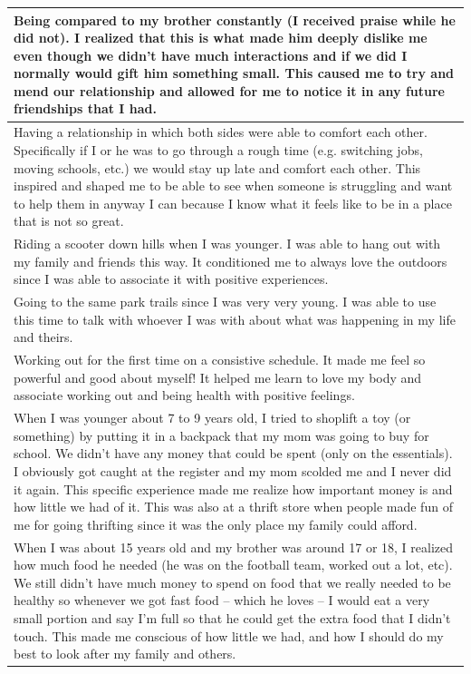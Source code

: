 \documentclass[
  .7em,
  letterpaper,
  DIV=11,
  numbers=noendperiod]{scrartcl}
\begin{document}
\begin{table}
\begin{tabular}{l}
\hline
Being compared to my brother constantly (I received praise while he did not). I realized that this is what made him deeply dislike me even though we didn't have much interactions and if we did I normally would gift him something small. This caused me to try and mend our relationship and allowed for me to notice it in any future friendships that I had.\\
\hline
Having a relationship in which both sides were able to comfort each other. Specifically if I or he was to go through a rough time (e.g. switching jobs, moving schools, etc.) we would stay up late and comfort each other. This inspired and shaped me to be able to see when someone is struggling and want to help them in anyway I can because I know what it feels like to be in a place that is not so great.\\
\hline
Riding a scooter down hills when I was younger. I was able to hang out with my family and friends this way. It conditioned me to always love the outdoors since I was able to associate it with positive experiences.\\
\hline
Going to the same park trails since I was very very young. I was able to use this time to talk with whoever I was with about what was happening in my life and theirs.\\
\hline
Working out for the first time on a consistive schedule. It made me feel so powerful and good about myself! It helped me learn to love my body and associate working out and being health with positive feelings.\\
\hline
When I was younger about 7 to 9 years old, I tried to shoplift a toy (or something) by putting it in a backpack that my mom was going to buy for school. We didn't have any money that could be spent (only on the essentials). I obviously got caught at the register and my mom scolded me and I never did it again. This specific experience made me realize how important money is and how little we had of it. This was also at a thrift store when people made fun of me for going thrifting since it was the only place my family could afford.\\
\hline
When I was about 15 years old and my brother was around 17 or 18, I realized how much food he needed (he was on the football team, worked out a lot, etc). We still didn't have much money to spend on food that we really needed to be healthy so whenever we got fast food -- which he loves -- I would eat a very small portion and say I'm full so that he could get the extra food that I didn't touch. This made me conscious of how little we had, and how I should do my best to look after my family and others.\\

\end{tabular}
\end{table}
\end{document}
